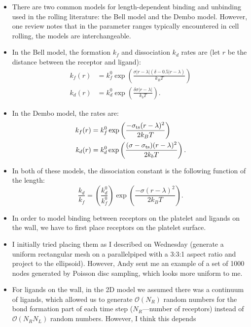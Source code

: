 \documentclass{article}
\newcommand{\tn}{\textnormal}
\begin{document}
\begin{itemize}
\item There are two common models for length-dependent binding and
  unbinding used in the rolling literature: the Bell model and the
  Dembo model. However, one review \cite{Pospieszalska2009} notes that
  in the parameter ranges typically encountered in cell rolling, the
  models are interchangeable.
\item In the Bell model, the formation $k_f$ and dissociation $k_d$
  rates are (let $r$ be the distance between the receptor and ligand): 
  \begin{align*}
    k_f(r) &= k_f^0 \exp\left(\frac{\sigma |r - \lambda | (\delta - 0.5
    |r - \lambda)}{k_B T}\right) \\
    k_d(r) &= k_d^0 \exp\left(\frac{\delta \sigma |r - \lambda|}{k_b
             T}\right).
  \end{align*}
\item In the Dembo model, the rates are:
  \begin{align*}
    k_f(r) &= k_f^0 \exp\left(\frac{-\sigma_\tn{ts}(r -
             \lambda)^2}{2k_B T}\right) \\
    k_d(r) &= k_d^0 \exp\left(\frac{(\sigma - \sigma_\tn{ts})(r -
             \lambda)^2}{2k_b T}\right). 
  \end{align*}
\item In both of these models, the dissociation constant is the
  following function of the length:
  \begin{equation*}
    \frac{k_d}{k_f} = \left(\frac{k_d^0}{k_f^0}\right) \exp \left(
      \frac{-\sigma(r - \lambda)^2}{2 k_B T} \right).
  \end{equation*}
\item In order to model binding between receptors on the platelet and
  ligands on the wall, we have to first place receptors on the
  platelet surface.
\item I initially tried placing them as I described on Wednesday
  (generate a uniform rectangular mesh on a parallelpiped with a 3:3:1
  aspect ratio and project to the ellipsoid). However, Andy sent me an example
  of a set of 1000 nodes generated by Poisson disc sampling, which
  looks more uniform to me.
\item For ligands on the wall, in the 2D model we assumed there was a
  continuum of ligands, which allowed us to generate
  $\mathcal{O}(N_R)$ random numbers for the bond formation part of
  each time step ($N_R$---number of receptors) instead of
  $\mathcal{O}(N_R N_L)$ random numbers. However, I think this depends

\end{itemize}
\end{document}
